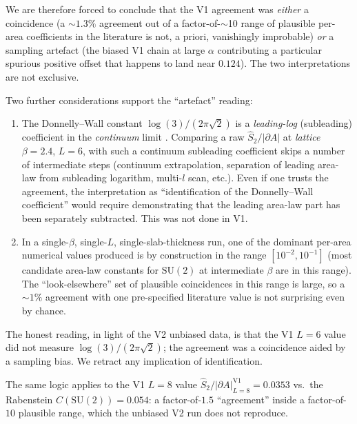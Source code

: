 \documentclass[11pt,a4paper]{article}
\theoremstyle{definition}
\newcommand{\SUtwo}{\mathrm{SU}(2)}
\begin{document}
We are therefore forced to conclude that the V1 agreement was
\emph{either} a coincidence (a $\sim 1.3\%$ agreement out of a
factor-of-$\sim$10 range of plausible per-area coefficients in the
literature is not, a priori, vanishingly improbable) \emph{or} a
sampling artefact (the biased V1 chain at large $\alpha$
contributing a particular spurious positive offset that happens to
land near $0.124$). The two interpretations are not exclusive.

Two further considerations support the ``artefact'' reading:

\begin{enumerate}
\item The Donnelly--Wall constant $\log(3)/(2\pi\sqrt 2)$ is a
      \emph{leading-log} (subleading) coefficient in the
      \emph{continuum} limit \cite{DonnellyWall2015}. Comparing a
      raw $\widehat S_2/|\partial A|$ at \emph{lattice} $\beta = 2.4$,
      $L = 6$, with such a continuum subleading coefficient skips a
      number of intermediate steps (continuum extrapolation,
      separation of leading area-law from subleading logarithm,
      multi-$l$ scan, etc.). Even if one trusts the agreement, the
      interpretation as ``identification of the Donnelly--Wall
      coefficient'' would require demonstrating that the leading
      area-law part has been separately subtracted. This was not
      done in V1.
\item In a single-$\beta$, single-$L$, single-slab-thickness run,
      one of the dominant per-area numerical values produced is by
      construction in the range
      $[10^{-2}, 10^{-1}]$ (most candidate area-law constants for
      $\SUtwo$ at intermediate $\beta$ are in this range). The
      ``look-elsewhere'' set of plausible coincidences in this
      range is large, so a $\sim 1\%$ agreement with one
      pre-specified literature value is not surprising even by
      chance.
\end{enumerate}

The honest reading, in light of the V2 unbiased data, is that the
V1 $L = 6$ value did not measure $\log(3)/(2\pi\sqrt 2)$; the
agreement was a coincidence aided by a sampling bias. We retract any
implication of identification.

The same logic applies to the V1 $L = 8$ value
$\widehat S_2/|\partial A|^{\mathrm{V1}}_{L=8} = 0.0353$ vs.\ the
Rabenstein $C(\SUtwo) = 0.054$: a factor-of-$1.5$ ``agreement''
inside a factor-of-$10$ plausible range, which the unbiased V2 run
does not reproduce.
\end{document}
